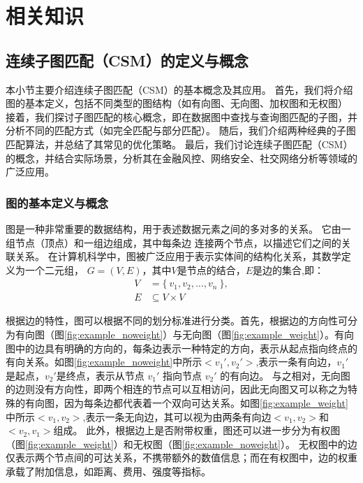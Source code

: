 \chapter{相关知识}

\section{连续子图匹配（CSM）的定义与概念}
本小节主要介绍连续子图匹配（CSM）的基本概念及其应用。
首先，我们将介绍图的基本定义，包括不同类型的图结构（如有向图、无向图、加权图和无权图）
接着，我们探讨子图匹配的核心概念，即在数据图中查找与查询图匹配的子图，并分析不同的匹配方式（如完全匹配与部分匹配）。
随后，我们介绍两种经典的子图匹配算法，并总结了其常见的优化策略。
最后，我们讨论连续子图匹配（CSM）的概念，并结合实际场景，分析其在金融风控、网络安全、社交网络分析等领域的广泛应用。
\subsection{图的基本定义与概念}
图是一种非常重要的数据结构，用于表述数据元素之间的多对多的关系。
它由一组节点（顶点）和一组边组成，其中每条边 连接两个节点，以描述它们之间的关联关系。
在计算机科学中，图被广泛应用于表示实体间的结构化关系，其数学定义为一个二元组，
$G=(V,E)$，其中$V$是节点的结合，$E$是边的集合,即：
\begin{align*}
  V &= \{\ v_1, v_2, \dots, v_n\ \},\\
  E &\subseteq V \times V
\end{align*}

根据边的特性，图可以根据不同的划分标准进行分类。首先，根据边的方向性可分为有向图（图\ref{fig:example_noweight}）与无向图（图\ref{fig:example_weight}）。有向图中的边具有明确的方向的，每条边表示一种特定的方向，表示从起点指向终点的有向关系。如图\ref{fig:example_noweight}中所示$<v_1',v_2'>$,表示一条有向边，$v_1'$是起点，$v_2'$是终点，表示从节点 $v_1'$ 指向节点 $v_2'$ 的有向边。
与之相对，无向图的边则没有方向性，即两个相连的节点可以互相访问，因此无向图又可以称之为特殊的有向图，因为每条边都代表着一个双向可达关系。如图\ref{fig:example_weight}中所示$<v_1,v_2>$,表示一条无向边，其可以视为由两条有向边$<v_1,v_2>$和$<v_2,v_1>$组成。
此外，根据边上是否附带权重，图还可以进一步分为有权图（图\ref{fig:example_weight}）和无权图（图\ref{fig:example_noweight}）。
无权图中的边仅表示两个节点间的可达关系，不携带额外的数值信息；而在有权图中，边的权重承载了附加信息，如距离、费用、强度等指标。

